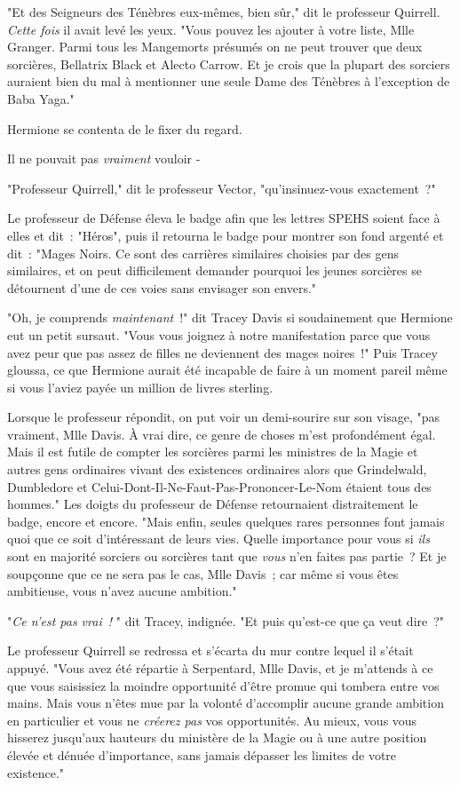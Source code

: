 "Et des Seigneurs des Ténèbres eux-mêmes, bien sûr," dit le professeur Quirrell. \emph{Cette fois} il avait levé les yeux. "Vous pouvez les ajouter à votre liste, Mlle Granger. Parmi tous les Mangemorts présumés on ne peut trouver que deux sorcières, Bellatrix Black et Alecto Carrow. Et je crois que la plupart des sorciers auraient bien du mal à mentionner une seule Dame des Ténèbres à l'exception de Baba Yaga."

Hermione se contenta de le fixer du regard.

Il ne pouvait pas \emph{vraiment} vouloir -

"Professeur Quirrell," dit le professeur Vector, "qu'insinuez-vous exactement~?"

Le professeur de Défense éleva le badge afin que les lettres SPEHS soient face à elles et dit~: "Héros", puis il retourna le badge pour montrer son fond argenté et dit~: "Mages Noirs. Ce sont des carrières similaires choisies par des gens similaires, et on peut difficilement demander pourquoi les jeunes sorcières se détournent d'une de ces voies sans envisager son envers."

"Oh, je comprends \emph{maintenant}~!" dit Tracey Davis si soudainement que Hermione eut un petit sursaut. "Vous vous joignez à notre manifestation parce que vous avez peur que pas assez de filles ne deviennent des mages noires~!" Puis Tracey gloussa, ce que Hermione aurait été incapable de faire à un moment pareil même si vous l'aviez payée un million de livres sterling.

Lorsque le professeur répondit, on put voir un demi-sourire sur son visage, "pas vraiment, Mlle Davis. À vrai dire, ce genre de choses m'est profondément égal. Mais il est futile de compter les sorcières parmi les ministres de la Magie et autres gens ordinaires vivant des existences ordinaires alors que Grindelwald, Dumbledore et Celui-Dont-Il-Ne-Faut-Pas-Prononcer-Le-Nom étaient tous des hommes." Les doigts du professeur de Défense retournaient distraitement le badge, encore et encore. "Mais enfin, seules quelques rares personnes font jamais quoi que ce soit d'intéressant de leurs vies. Quelle importance pour vous si \emph{ils} sont en majorité sorciers ou sorcières tant que \emph{vous} n'en faites pas partie~? Et je soupçonne que ce ne sera pas le cas, Mlle Davis~; car même si vous êtes ambitieuse, vous n'avez aucune ambition."

"\emph{Ce n'est pas vrai~!} " dit Tracey, indignée. "Et puis qu'est-ce que ça veut dire~?"

Le professeur Quirrell se redressa et s'écarta du mur contre lequel il s'était appuyé. "Vous avez été répartie à Serpentard, Mlle Davis, et je m'attends à ce que vous saisissiez la moindre opportunité d'être promue qui tombera entre vos mains. Mais vous n'êtes mue par la volonté d'accomplir aucune grande ambition en particulier et vous ne \emph{créerez pas} vos opportunités. Au mieux, vous vous hisserez jusqu'aux hauteurs du ministère de la Magie ou à une autre position élevée et dénuée d'importance, sans jamais dépasser les limites de votre existence."

